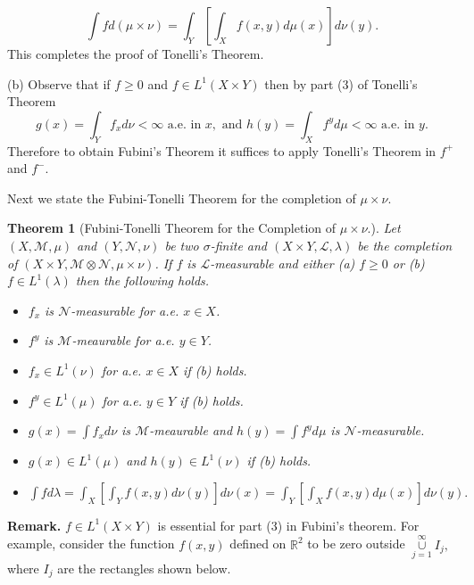 \documentclass[12pt]{report}
\newtheorem{theorem}{Theorem}[section]
\begin{document}
\[
\int fd (\mu \times \nu) = \int_Y \left [ \int_X f(x, y) d
\mu(x) \right ] d \nu(y).
\]
This completes the proof of Tonelli's Theorem.

\medskip
\noindent
(b)  Observe that if $f \ge 0$ and $f \in L^1 (X
\times Y)$ then by part (3) of Tonelli's Theorem
\[
g(x) = \int_Y f_x d \nu < \infty \mbox{ a.e. in }x, \mbox{ and }
h(y) = \int_X f^y d \mu< \infty \mbox{ a.e. in } y.
\]
Therefore to obtain Fubini's Theorem it suffices to apply
Tonelli's Theorem in $f^+$ and $f^-$.



\vspace{.15cm}
\noindent
Next we state the Fubini-Tonelli Theorem for the
completion of $\mu \times \nu$.

\vspace{.25cm}
\noindent
\begin{theorem}[Fubini-Tonelli Theorem for the Completion of $\mu
\times \nu$.]  Let $(X, \mathcal{M}, \mu)$ and $(Y,
\mathcal{N}, \nu)$ be two $\sigma$-finite and $(X \times Y,
\mathcal{L}, \lambda)$ be the completion of $(X \times Y,
\mathcal{M} \otimes \mathcal{N}, \mu \times \nu)$.  If $f$ is
$\mathcal{L}$-measurable and either (a) $f \ge 0$ or (b) $f \in
L^1(\lambda)$ then the following holds.

\begin{itemize}
\item[$\bullet$]  $f_x$ is $\mathcal{N}$-measurable for a.e.
$x \in X$.
\item[$\bullet$]  $f^y$ is $\mathcal{M}$-meaurable for a.e.
$y \in Y$.
\item[$\bullet$]  $f_x \in L^1(\nu)$ for a.e. $x \in X$ if (b)
holds.
\item[$\bullet$]  $f^y\in L^1(\mu)$  for a.e.
$y \in Y$ if (b) holds.
\item[$\bullet$]  $g(x) = \int f_x d \nu$ is
$\mathcal{M}$-meaurable and  $h(y) = \int f^y d \mu$ is
$\mathcal{N}$-measurable.
\item[$\bullet$]  $g(x) \in L^1 (\mu)$ and $h(y) \in L^1(\nu)$ if
(b) holds.
\item[$\bullet$]  $\int f d \lambda = \int_X \left [ \int_Y f(x,
y) d \nu(y) \right ] d \nu(x) = \int_Y \left [ \int_X f(x, y) d
\mu(x) \right ] d \nu(y).$
\end{itemize}
\end{theorem}

\noindent
{\bf Remark.}  $f \in L^1 (X \times Y)$ is essential
for part (3) in Fubini's theorem. 
 For example, consider the
function $f(x, y)$ defined on $\mathbb{R}^2$ to be zero
outside $\underset{j=1}{\overset{\infty}{\cup}} I_j,$ where
$I_j$ are the  rectangles shown below.
\end{document}
